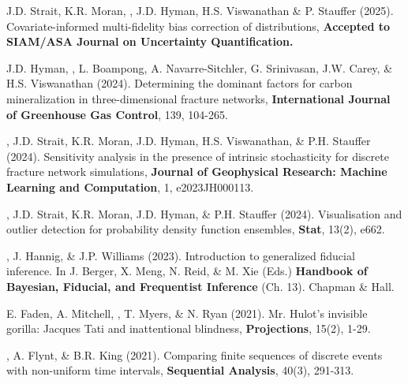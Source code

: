 \begin{etaremune}
\item J.D. Strait, K.R. Moran, , J.D. Hyman, H.S. Viswanathan \& P. Stauffer (2025). Covariate-informed multi-fidelity bias correction of distributions, \textbf{Accepted to SIAM/ASA Journal on Uncertainty Quantification.}
\item J.D. Hyman, , L. Boampong, A. Navarre-Sitchler, G. Srinivasan, J.W. Carey, \& H.S. Viswanathan (2024). Determining the dominant factors for carbon mineralization in three-dimensional fracture networks, \textbf{International Journal of Greenhouse Gas Control}, 139, 104-265.
\item {}, J.D. Strait, K.R. Moran, J.D. Hyman, H.S. Viswanathan, \& P.H. Stauffer (2024).  Sensitivity analysis in the presence of intrinsic stochasticity for discrete fracture network simulations, \textbf{Journal of Geophysical Research: Machine Learning and Computation}, 1, e2023JH000113.
\item {}, J.D. Strait, K.R. Moran, J.D. Hyman, \& P.H. Stauffer (2024). Visualisation and outlier detection for probability density function ensembles, \textbf{Stat}, 13(2), e662.
\item {}, J. Hannig, \& J.P. Williams (2023). Introduction to generalized fiducial inference.  In J. Berger, X. Meng, N. Reid, \& M. Xie (Eds.) \textbf{Handbook of Bayesian, Fiducial, and Frequentist Inference} (Ch. 13).  Chapman \& Hall. 
\item E. Faden, A. Mitchell, , T. Myers, \& N. Ryan (2021). Mr. Hulot’s invisible gorilla: Jacques Tati and inattentional blindness, \textbf{Projections}, 15(2), 1-29.
\item {}, A. Flynt, \& B.R. King (2021).  Comparing finite sequences of discrete events with non-uniform time intervals, \textbf{Sequential Analysis}, 40(3), 291-313.
\end{etaremune}